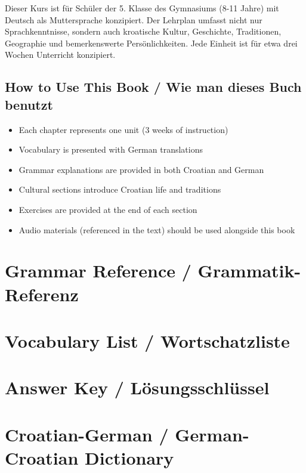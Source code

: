 \documentclass[11pt,a4paper,twoside]{book}
\begin{document}
Dieser Kurs ist für Schüler der 5. Klasse des Gymnasiums (8-11 Jahre) mit Deutsch als Muttersprache konzipiert. Der Lehrplan umfasst nicht nur Sprachkenntnisse, sondern auch kroatische Kultur, Geschichte, Traditionen, Geographie und bemerkenswerte Persönlichkeiten. Jede Einheit ist für etwa drei Wochen Unterricht konzipiert.

\section*{How to Use This Book / Wie man dieses Buch benutzt}
\begin{itemize}
    \item Each chapter represents one unit (3 weeks of instruction)
    \item Vocabulary is presented with German translations
    \item Grammar explanations are provided in both Croatian and German
    \item Cultural sections introduce Croatian life and traditions
    \item Exercises are provided at the end of each section
    \item Audio materials (referenced in the text) should be used alongside this book
\end{itemize}

\clearpage














\appendix
\chapter{Grammar Reference / Grammatik-Referenz}


\chapter{Vocabulary List / Wortschatzliste}


\chapter{Answer Key / Lösungsschlüssel}


\chapter{Croatian-German / German-Croatian Dictionary}

\end{document}
